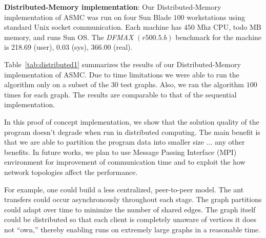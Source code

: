 \documentclass[11pt]{article}
\begin{document}
\textbf{Distributed-Memory implementation}: Our Distributed-Memory implementation of ASMC was run on four Sun Blade $100$  workstations using standard Unix socket communication.  Each machine has $450$ Mhz CPU, todo MB memory, and runs Sun OS.  The \textit{DFMAX} $(r500.5.b)$ benchmark for the machine is 218.69 (user), 0.03 (sys), 366.00 (real).%


Table~\ref{tab:distributed1} summarizes the results of our Distributed-Memory implementation of ASMC. Due to time limitations we were able to run the algorithm only on a subset of the $30$ test graphs.  Also, we ran the algorithm $100$ times for each graph.  The results are comparable to that of the sequential implementation. 


In this proof of concept implementation, we show that the solution quality of the program doesn't degrade when run in distributed computing.  The main benefit is that we are able to partition the program data into smaller size ... any other benefits.  In future works, we plan to use Message Passing Interface (MPI) environment for improvement of communication time and to exploit the how network topologies affect the performance. 




For example, one could build a less centralized, peer-to-peer
model.  The ant transfers could occur asynchronously throughout each stage.
The graph partitions could adapt over time to minimize the number of shared
edges.  The graph itself could be distributed so that each client is
completely unaware of vertices it does not ``own,'' thereby enabling runs on
extremely large graphs in a reasonable time.



\end{document}
